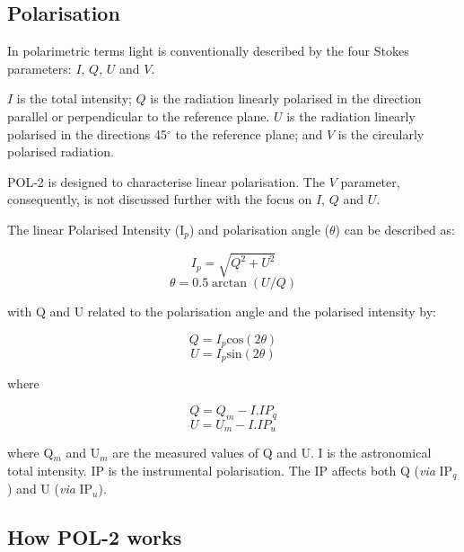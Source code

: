 \subsection*{Polarisation}

In polarimetric terms light is conventionally described by the four
Stokes parameters: $I$, $Q$, $U$ and $V$.


$I$ is the total intensity; $Q$ is the radiation linearly polarised in
the direction parallel or perpendicular to the reference plane. $U$ is
the radiation linearly polarised in the directions 45$^{\circ }$ to
the reference plane; and $V$ is the circularly polarised radiation.

POL-2 is designed to characterise linear polarisation.  The $V$
parameter, consequently, is not discussed further with the focus on $I$,
$Q$ and $U$.

The linear Polarised Intensity (I$_{p}$) and  polarisation angle
($\theta$) can be described as:

\begin{equation}
I_{p} = \sqrt{Q^{2}+U^{2}}
\end{equation}
\begin{equation}
\theta = 0.5\arctan(U/Q)
\end{equation}

with Q and U related to the polarisation angle and the polarised intensity by:

\begin{equation}
Q = I_{p} \text{cos}(2\theta)
\end{equation}
\begin{equation}
U = I_{p} \text{sin}(2\theta)
\end{equation}

where

\begin{equation}
Q = Q_{m} - I . IP_{q}
\end{equation}
\begin{equation}
U = U_{m} - I . IP_{u}
\end{equation}

where Q$_{m}$ and U$_{m}$ are the measured values of Q and U.  I is
the astronomical total intensity.  IP is the instrumental
polarisation. The IP affects both Q (\emph{via} IP$_{q}$) and U
(\emph{via} IP$_{u}$).


\subsection*{How POL-2 works}

